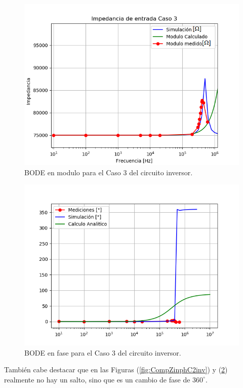 \begin{figure}[H]	
	\centering
	\includegraphics[width=\textwidth]{Ejercicio1/Imagenes/CZinC3.png}
	\caption{BODE en modulo para el Caso 3 del circuito inversor.}
	\label{fig:CompZinC3inv}
\end{figure} 

\begin{figure}[H]	
	\centering
	\includegraphics[width=\textwidth]{Ejercicio1/Imagenes/ZinphC3.png}
	\caption{BODE en fase para el Caso 3 del circuito inversor.}
	\label{fig:CompZinphC3inv}
\end{figure}

También cabe destacar que en las Figuras (\ref{fig:CompZinphC2inv}) y (\ref{fig:CompZinphC3inv}) realmente no hay un salto, sino que es un cambio de fase de $360^{\circ}$.

